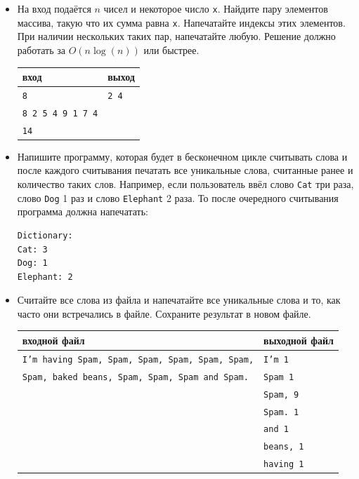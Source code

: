 \documentclass{article}
\begin{document}
\newpage
\begin{itemize}
\item На вход подаётся $n$ чисел и некоторое число \texttt{x}. Найдите пару элементов массива, такую что их сумма равна \texttt{x}. Напечатайте индексы этих элементов. При наличии нескольких таких пар, напечатайте любую. Решение должно работать за $O(n \log(n))$ или быстрее.
\begin{center}
\begin{tabular}{ l | l }
 вход & выход \\ \hline
 \texttt{8} & \texttt{2 4}  \\ 
 \texttt{8 2 5 4 9 1 7 4} &  \\
 \texttt{14} &  \\
\end{tabular}
\end{center}

\item Напишите программу, которая будет в бесконечном цикле считывать слова и после каждого считывания печатать все уникальные слова, считанные ранее и количество таких слов. Например, если пользователь ввёл слово \texttt{Cat} три раза, слово \texttt{Dog} 1 раз и слово \texttt{Elephant} 2 раза. То после очередного считывания программа должна напечатать:
\begin{verbatim}
Dictionary:
Cat: 3
Dog: 1
Elephant: 2
\end{verbatim}
\item Считайте все слова из файла и напечатайте все уникальные слова и то, как часто они встречались в файле. Сохраните результат в новом файле.
\begin{center}
\begin{tabular}{ l | l }
 входной файл & выходной файл \\ \hline
 \texttt{I'm having Spam, Spam, Spam, Spam, Spam, Spam,} & \texttt{I'm 1}  \\
 \texttt{Spam, baked beans, Spam, Spam, Spam and Spam.}  &  \texttt{Spam 1}  \\
                                                         &  \texttt{Spam, 9}  \\ 
                                                         &  \texttt{Spam. 1}  \\ 
                                                         &  \texttt{and 1}  \\ 
                                                         &  \texttt{beans, 1}  \\ 
                                                         &  \texttt{having 1}  \\                                                      
\end{tabular}
\end{center}
\end{itemize}
\end{document}
